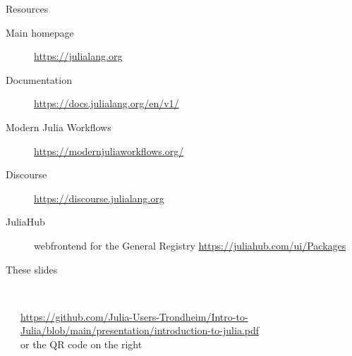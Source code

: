 \documentclass[aspectratio=169, 11pt, handout]{beamer}
\begin{document}
    \begin{frame}{Resources}
        \begin{description}
            \item[Main homepage] \url{https://julialang.org}
            \vspace{.5\baselineskip}
            \item[Documentation] \url{https://docs.julialang.org/en/v1/}
            \vspace{.5\baselineskip}
            \item[Modern Julia Workflows] \url{https://modernjuliaworkflows.org/}
            \vspace{.5\baselineskip}
            \item[Discourse] \url{https://discourse.julialang.org}
            \vspace{.5\baselineskip}
            \item[JuliaHub] webfrontend for the General Registry
            \url{https://juliahub.com/ui/Packages}
            \vspace{.5\baselineskip}
            \item[These slides]
        \end{description}
        \vspace{-4\baselineskip}
        \begin{columns}[T]
            \begin{column}{.075\textwidth}
            \end{column}
            \begin{column}{.64\textwidth}
                \ \\[3.5\baselineskip]
                \url{https://github.com/Julia-Users-Trondheim/Intro-to-Julia/blob/main/presentation/introduction-to-julia.pdf}
                \\[\baselineskip] or the QR code on the right
            \end{column}
            \begin{column}{.33\textwidth}
            \end{column}
            \begin{column}{.005\textwidth}
            \end{column}
        \end{columns}
        \vspace{.75\baselineskip}
    \end{frame}
\end{document}
